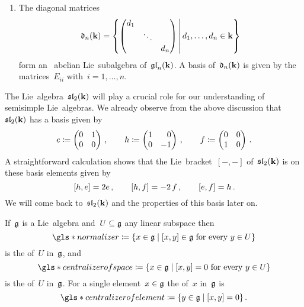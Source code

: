 \begin{examples}
\begin{enumerate}
    \item
      The diagonal matrices
      \[
        \dlie_n(\kf)
        =
        \left\{
          \begin{pmatrix}
              d_1
            & {}
            & {}
            \\
              {}
            & \ddots
            & {}
            \\
              {}
            & {}
            & d_n
          \end{pmatrix}
        \suchthat*
          d_1, \dotsc, d_n \in \kf
        \right\}
      \]
      form an~{} abelian Lie~subalgebra of~$\mathfrak{gl}_n(\mathbf{k})$.
      A basis of~$\mathfrak{d}_n(\mathbf{k})$ is given by the matrices~$E_{ii}$ with~$i = 1, \dotsc, n$.
  \end{enumerate}
\end{examples}


\begin{remark}
  The Lie~algebra~$\mathfrak{sl}_2(\mathbf{k})$ will play a crucial role for our understanding of semisimple Lie~algebras.
  We already observe from the above discussion that~$\mathfrak{sl}_2(\mathbf{k})$ has a basis given by
  \[
    e
    \defined
    \begin{pmatrix}
      0 & 1 \\
      0 & 0
    \end{pmatrix} \,,
    \qquad
    h
    \defined
    \begin{pmatrix*}[r]
      1 &  0  \\
      0 & -1
    \end{pmatrix*}  \,,
    \qquad
    f
    \defined
    \begin{pmatrix}
      0 & 0 \\
      1 & 0
    \end{pmatrix} \,.
  \]
  A straightforward calculation shows that the Lie~bracket~$[-,-]$ of~$\mathfrak{sl}_2(\mathbf{k})$ is on these basis elements given by
  \[
    [h, e]
    =
    2e  \,,
    \qquad
    [h, f]
    =
    -2 \, f \,,
    \qquad
    [e,f]
    =
    h \,.
  \]
  We will come back to~$\mathfrak{sl}_2(\mathbf{k})$ and the properties of this basis later on.
\end{remark}


\begin{definition}
  If~$\mathfrak{g}$ is a Lie~algebra and~$U \subseteq \mathfrak{g}$ any linear subspace then
  \[
    \gls*{normalizer}
    \defined
    \{
      x \in \glie
    \suchthat
      \text{$[x,y] \in \glie$ for every~$y \in U$}
    \}
  \]
  is the  of~$U$ in~$\mathfrak{g}$, and
  \[
    \gls*{centralizer of space}
    \defined
    \{
      x \in \glie
    \suchthat
      \text{$[x,y] = 0$ for every~$y \in U$}
    \}
  \]
  is the  of~$U$ in~$\mathfrak{g}$.
  For a single element~$x \in \mathfrak{g}$ the  of~$x$ in~$\mathfrak{g}$ is
  \[
    \gls*{centralizer of element}
    \defined
    \{
      y \in \glie
    \suchthat
      [x,y] = 0
    \} \,.
  \]
\end{definition}


